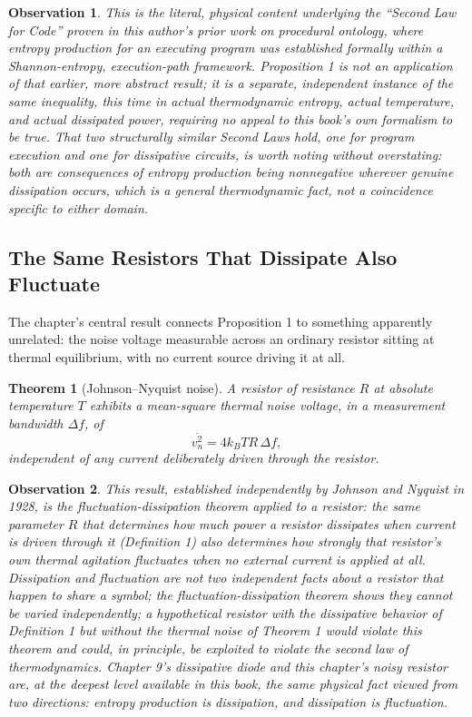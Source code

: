 \documentclass[12pt]{article}
\newtheorem{theorem}{Theorem}
\newtheorem{observation}{Observation}
\begin{document}
\begin{observation}
This is the literal, physical content underlying the ``Second Law for Code'' proven in this author's prior work on procedural ontology, where entropy production for an executing program was established formally within a Shannon-entropy, execution-path framework. Proposition 1 is not an application of that earlier, more abstract result; it is a separate, independent instance of the same inequality, this time in actual thermodynamic entropy, actual temperature, and actual dissipated power, requiring no appeal to this book's own formalism to be true. That two structurally similar Second Laws hold, one for program execution and one for dissipative circuits, is worth noting without overstating: both are consequences of entropy production being nonnegative wherever genuine dissipation occurs, which is a general thermodynamic fact, not a coincidence specific to either domain.
\end{observation}

\subsection{The Same Resistors That Dissipate Also Fluctuate}

The chapter's central result connects Proposition 1 to something apparently unrelated: the noise voltage measurable across an ordinary resistor sitting at thermal equilibrium, with no current source driving it at all.

\begin{theorem}[Johnson--Nyquist noise]
A resistor of resistance $R$ at absolute temperature $T$ exhibits a mean-square thermal noise voltage, in a measurement bandwidth $\Delta f$, of
\[
\overline{v_n^2} = 4 k_B T R\, \Delta f,
\]
independent of any current deliberately driven through the resistor.
\end{theorem}

\begin{observation}
This result, established independently by Johnson and Nyquist in 1928, is the fluctuation-dissipation theorem applied to a resistor: the same parameter $R$ that determines how much power a resistor dissipates when current is driven through it (Definition 1) also determines how strongly that resistor's own thermal agitation fluctuates when no external current is applied at all. Dissipation and fluctuation are not two independent facts about a resistor that happen to share a symbol; the fluctuation-dissipation theorem shows they cannot be varied independently; a hypothetical resistor with the dissipative behavior of Definition 1 but without the thermal noise of Theorem 1 would violate this theorem and could, in principle, be exploited to violate the second law of thermodynamics. Chapter 9's dissipative diode and this chapter's noisy resistor are, at the deepest level available in this book, the same physical fact viewed from two directions: entropy production is dissipation, and dissipation is fluctuation.
\end{observation}
\end{document}
